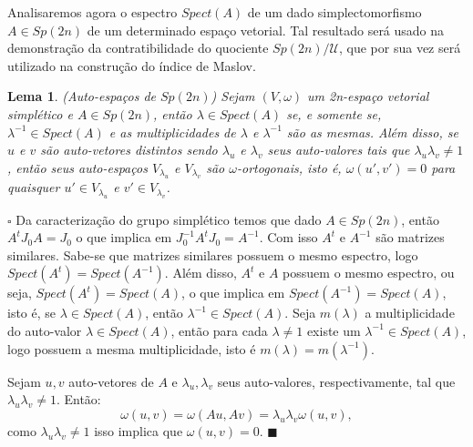 \documentclass[12pt]{book}
\newtheorem{lema}[teorema]{Lema}
\newenvironment{prova}[1]{$\square$ #1}{\hfill$\blacksquare$}
\newcommand{\espectro}[1]{Spect(#1)}
\newcommand{\gruposimpletico}[1]{Sp(#1)}
\begin{document}
	Analisaremos agora o espectro $\espectro{A}$ de um dado simplectomorfismo $A \in \gruposimpletico{2n}$ de um determinado espaço vetorial. Tal resultado será usado na demonstração da contratibilidade do quociente $\gruposimpletico{2n}/\mathcal{U}$, que por sua vez será utilizado na construção do índice de Maslov. 
	\begin{lema}
		(Auto-espaços de $\gruposimpletico{2n}$) Sejam $(V, \omega)$ um 2n-espaço vetorial simplético e $A \in \gruposimpletico{2n}$, então $\lambda \in \espectro{A}$ se, e somente se, $\lambda^{-1} \in \espectro{A}$ e as multiplicidades de $\lambda$ e $\lambda^{-1}$ são as mesmas. Além disso, se $u$ e $v$ são auto-vetores distintos sendo $\lambda_{u}$ e $\lambda_{v}$ seus auto-valores tais que $\lambda_{u}\lambda_{v} \neq 1$, então seus auto-espaços $V_{\lambda_{u}}$ e $V_{\lambda_{v}}$ são $\omega$-ortogonais, isto é, $\omega(u',v') = 0$ para quaisquer $u' \in V_{\lambda_{u}}$ e $v' \in V_{\lambda_{v}}$. 
	\end{lema}
	\begin{prova}
		Da caracterização do grupo simplético temos que dado $A \in \gruposimpletico{2n}$, então $A^{t}J_{0}A = J_{0}$ o que implica em $J_{0}^{-1}A^{t}J_{0} = A^{-1}$. Com isso $A^{t}$ e $A^{-1}$ são matrizes similares. Sabe-se que matrizes similares possuem o mesmo espectro, logo $\espectro{A^{t}}=\espectro{A^{-1}}$. Além disso, $A^{t}$ e $A$ possuem o mesmo espectro, ou seja, $\espectro{A^{t}} = \espectro{A}$, o que implica em $\espectro{A^{-1}} = \espectro{A}$, isto é, se $\lambda \in \espectro{A}$, então $\lambda^{-1} \in \espectro{A}$. Seja $m(\lambda)$ a multiplicidade do auto-valor $\lambda \in \espectro{A}$, então para cada $\lambda \neq 1$ existe um $\lambda^{-1} \in \espectro{A}$, logo possuem a mesma multiplicidade, isto é $m(\lambda) = m(\lambda^{-1})$.
		
		Sejam $u, v$ auto-vetores de $A$ e $\lambda_{u}, \lambda_{v}$ seus auto-valores, respectivamente, tal que $\lambda_{u}\lambda_{v}\neq 1$. Então:
		$$
		\omega(u,v)=\omega(Au,Av) = \lambda_{u}\lambda_{v}\omega(u,v), 
		$$
		como $\lambda_{u}\lambda_{v}\neq 1$ isso implica que $\omega(u,v)=0$.
	\end{prova}
	
\end{document}
